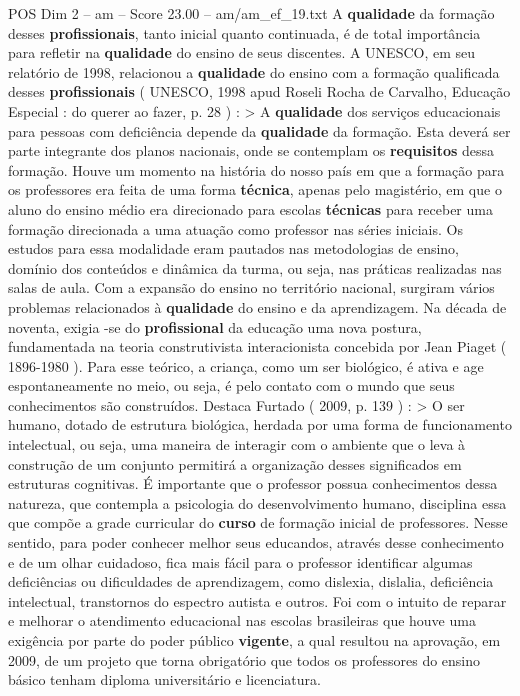 \begin{textsample}{POS Dim 2 – am – Score 23.00 – am/am\_ef\_19.txt}
A \textbf{qualidade} da formação desses \textbf{profissionais}, tanto inicial quanto continuada, é de total importância para refletir na \textbf{qualidade} do ensino de seus discentes.
A UNESCO, em seu relatório de 1998, relacionou a \textbf{qualidade} do ensino com a formação qualificada desses \textbf{profissionais} ( UNESCO, 1998 apud Roseli Rocha de Carvalho, Educação Especial : do querer ao fazer, p. 28 ) : > A \textbf{qualidade} dos serviços educacionais para pessoas com deficiência depende da \textbf{qualidade} da formação.
Esta deverá ser parte integrante dos planos nacionais, onde se contemplam os \textbf{requisitos} dessa formação.
Houve um momento na história do nosso país em que a formação para os professores era feita de uma forma \textbf{técnica}, apenas pelo magistério, em que o aluno do ensino médio era direcionado para escolas \textbf{técnicas} para receber uma formação direcionada a uma atuação como professor nas séries iniciais.
Os estudos para essa modalidade eram pautados nas metodologias de ensino, domínio dos conteúdos e dinâmica da turma, ou seja, nas práticas realizadas nas salas de aula.
Com a expansão do ensino no território nacional, surgiram vários problemas relacionados à \textbf{qualidade} do ensino e da aprendizagem.
Na década de noventa, exigia -se do \textbf{profissional} da educação uma nova postura, fundamentada na teoria construtivista interacionista concebida por Jean Piaget ( 1896-1980 ).
Para esse teórico, a criança, como um ser biológico, é ativa e age espontaneamente no meio, ou seja, é pelo contato com o mundo que seus conhecimentos são construídos.
Destaca Furtado ( 2009, p. 139 ) : > O ser humano, dotado de estrutura biológica, herdada por uma forma de funcionamento intelectual, ou seja, uma maneira de interagir com o ambiente que o leva à construção de um conjunto permitirá a organização desses significados em estruturas cognitivas.
É importante que o professor possua conhecimentos dessa natureza, que contempla a psicologia do desenvolvimento humano, disciplina essa que compõe a grade curricular do \textbf{curso} de formação inicial de professores.
Nesse sentido, para poder conhecer melhor seus educandos, através desse conhecimento e de um olhar cuidadoso, fica mais fácil para o professor identificar algumas deficiências ou dificuldades de aprendizagem, como dislexia, dislalia, deficiência intelectual, transtornos do espectro autista e outros.
Foi com o intuito de reparar e melhorar o atendimento educacional nas escolas brasileiras que houve uma exigência por parte do poder público \textbf{vigente}, a qual resultou na aprovação, em 2009, de um projeto que torna obrigatório que todos os professores do ensino básico tenham diploma universitário e licenciatura.

\end{textsample}
